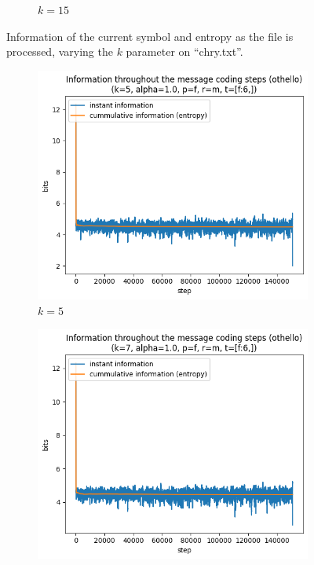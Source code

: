 \documentclass{article}
\begin{document}
\begin{figure}
\begin{subfigure}[b]{0.3\textwidth}
\begin{center}
        \end{center}
        \caption{$k = 15$}
        \label{fig:results-pattern-size-15}
    \end{subfigure}
    \caption{Information of the current symbol and entropy as the file is processed, varying the $k$ parameter on ``chry.txt''.}
    \label{fig:results-pattern-size}
\end{figure}

\begin{figure}
    \begin{subfigure}[b]{0.3\textwidth}
        \begin{center}
            \includegraphics[width=1.0\linewidth]{../scripts/images/othello_5_1.0_f_m_[f:6,].png}
        \end{center}
        \caption{$k = 5$}
        \label{fig:results-pattern-size-other-5}
    \end{subfigure}
    \hfill
    \begin{subfigure}[b]{0.3\textwidth}
        \begin{center}
            \includegraphics[width=1.0\linewidth]{../scripts/images/othello_7_1.0_f_m_[f:6,].png}

\end{center}
\end{subfigure}
\end{figure}
\end{document}
